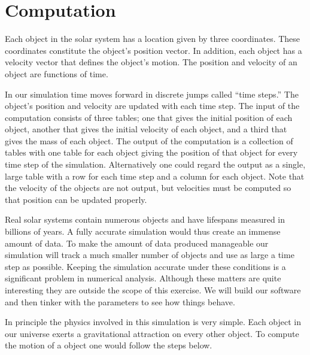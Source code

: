
\section{Computation}
\label{sec:computation}

Each object in the solar system has a location given by three coordinates. These coordinates
constitute the object's position vector. In addition, each object has a velocity vector that
defines the object's motion. The position and velocity of an object are functions of time.

In our simulation time moves forward in discrete jumps called ``time steps.'' The object's
position and velocity are updated with each time step. The input of the computation consists of
three tables; one that gives the initial position of each object, another that gives the initial
velocity of each object, and a third that gives the mass of each object. The output of the
computation is a collection of tables with one table for each object giving the position of that
object for every time step of the simulation. Alternatively one could regard the output as a
single, large table with a row for each time step and a column for each object. Note that the
velocity of the objects are not output, but velocities must be computed so that position can be
updated properly.

Real solar systems contain numerous objects and have lifespans measured in billions of years. A
fully accurate simulation would thus create an immense amount of data. To make the amount of
data produced manageable our simulation will track a much smaller number of objects and use as
large a time step as possible. Keeping the simulation accurate under these conditions is a
significant problem in numerical analysis. Although these matters are quite interesting they are
outside the scope of this exercise. We will build our software and then tinker with the
parameters to see how things behave.

In principle the physics involved in this simulation is very simple. Each object in our universe
exerts a gravitational attraction on every other object. To compute the motion of a object one
would follow the steps below.

